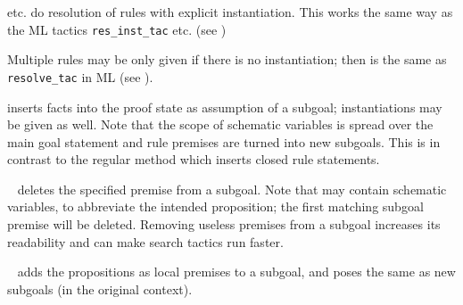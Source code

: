 \begin{isabellebody}
\begin{isamarkuptext}
\begin{description}

  \item \hyperlink{method.rule-tac}{\mbox{}} etc. do resolution of rules with explicit
  instantiation.  This works the same way as the ML tactics \verb|res_inst_tac| etc. (see \cite{isabelle-implementation})

  Multiple rules may be only given if there is no instantiation; then
  \hyperlink{method.rule-tac}{\mbox{}} is the same as \verb|resolve_tac| in ML (see
  \cite{isabelle-implementation}).

  \item \hyperlink{method.cut-tac}{\mbox{}} inserts facts into the proof state as
  assumption of a subgoal; instantiations may be given as well.  Note
  that the scope of schematic variables is spread over the main goal
  statement and rule premises are turned into new subgoals.  This is
  in contrast to the regular method \hyperlink{method.insert}{\mbox{}} which inserts
  closed rule statements.

  \item \hyperlink{method.thin-tac}{\mbox{}}~ deletes the specified premise
  from a subgoal.  Note that  may contain schematic
  variables, to abbreviate the intended proposition; the first
  matching subgoal premise will be deleted.  Removing useless premises
  from a subgoal increases its readability and can make search tactics
  run faster.

  \item \hyperlink{method.subgoal-tac}{\mbox{}}~ adds the propositions
   as local premises to a subgoal, and poses the same
  as new subgoals (in the original context).


\end{description}
\end{isamarkuptext}
\end{isabellebody}
